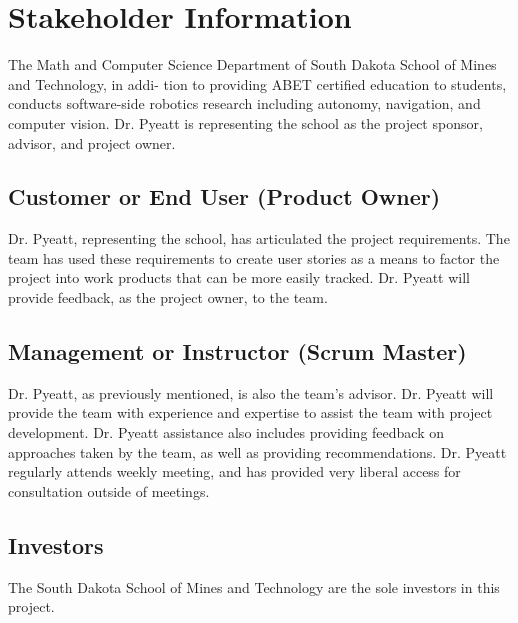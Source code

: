\section{ Stakeholder Information}
The Math and Computer Science Department of South Dakota School of Mines and Technology, in addi-
tion to providing ABET certified education to students, conducts software-side robotics research including
autonomy, navigation, and computer vision. Dr. Pyeatt is representing the school as the project sponsor, advisor, and project owner.\\


\subsection{Customer or End User (Product Owner)}
Dr. Pyeatt, representing the school, has articulated the project requirements. The team has used these requirements to create user stories as a means to factor the project into work products that can be more easily tracked. Dr. Pyeatt will provide feedback, as the project owner, to the team.\\ 

\subsection{Management or Instructor (Scrum Master)}
Dr. Pyeatt, as previously mentioned, is also the team's advisor. Dr. Pyeatt will provide the team with experience and expertise to assist the team with project development. Dr. Pyeatt assistance also includes providing feedback on approaches taken by the team, as well as providing recommendations. Dr. Pyeatt regularly attends weekly meeting, and has provided very liberal access for consultation outside of meetings.\\


\subsection{Investors}
The South Dakota School of Mines and Technology are the sole investors in this project.\\



